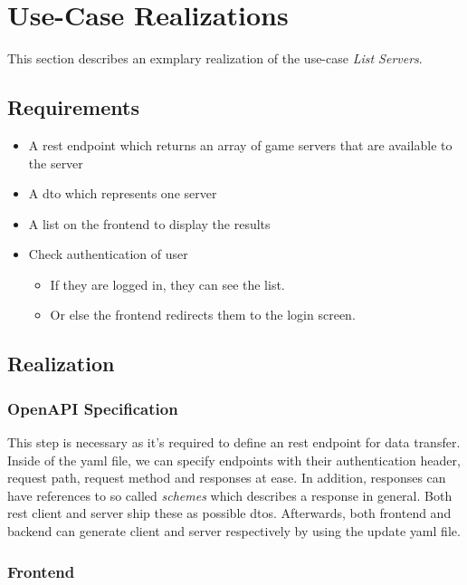 \documentclass[a4paper,12pt,chapterprefix=false,bibliography=totoc,listof=totoc,]{scrreprt}
\begin{document}
\section{Use-Case Realizations}
This section describes an exmplary realization of the use-case \textit{List Servers}.
\subsection{Requirements}
\begin{itemize}
	\item A \gls{rest} endpoint which returns an array of game servers that are available to the server
	\item A \gls{dto} which represents one server
	\item A list on the frontend to display the results
	\item Check authentication of user
	\begin{itemize}
		\item If they are logged in, they can see the list.
		\item Or else the frontend redirects them to the login screen.
	\end{itemize}
\end{itemize}
\subsection{Realization}
\subsubsection{OpenAPI Specification}
This step is necessary as it's required to define an \gls{rest} endpoint for data transfer. Inside of the \gls{yaml} file, we can specify endpoints with their authentication header, request path, request method and responses at ease.
In addition, responses can have references to so called \textit{schemes} which describes a response in general. Both \gls{rest} client and server ship these as possible \gls{dto}s.
Afterwards, both frontend and backend can generate client and server respectively by using the update \gls{yaml} file.
\subsubsection{Frontend}
\end{document}

